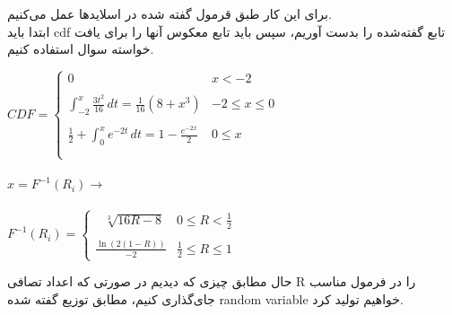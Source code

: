 

برای این کار طبق قرمول گفته شده در اسلایدها عمل می‌کنیم.
\\
ابتدا باید cdf تابع گفته‌شده را بدست آوریم، سپس باید تابع معکوس آنها را برای یافت خواسته سوال استفاده کنیم.
\\

\begin{latin}
    \noindent
    $CDF =
    \begin{cases}
        0 & x < -2 \\\\
        \int_{-2}^{x} \frac{3t^2}{16}   \,dt = \frac{1}{16}(8 + x^3) & -2 \leq x \leq 0 \\\\
        \frac{1}{2} + \int_{0}^{x} e^{-2t}  \,dt = 1 - \frac{e^{-2 x}}{2} & 0 \leq x \\\\

    \end{cases}$\\\\


    \noindent
    $x=F^{-1}(R_i)\rightarrow$ \\\\
    $F^{-1}(R_i) = \begin{cases}
            \text{ }\sqrt[3]{16R-8} & 0 \leq R < \frac{1}{2} \\\\
            \frac{\ln(2(1-R))}{-2}                               & \frac{1}{2} \leq R \leq 1
        \end{cases} $
\end{latin}
حال مطابق چیزی که دیدیم در صورتی که اعداد تصافی R را در فرمول مناسب جای‌گذاری کنیم، مطابق توزیع گفته شده random variable خواهیم تولید کرد.

